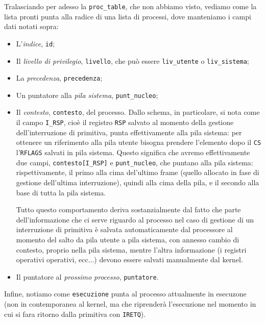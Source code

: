 \documentclass[a4paper,11pt]{article}
\begin{document}
Tralasciando per adesso la \lstinline|proc_table|, che non abbiamo visto, vediamo come la lista pronti punta alla radice di una lista di processi, dove manteniamo i campi dati notati sopra:
\begin{itemize}
	\item L'\textit{indice}, \lstinline|id|; 
	\item Il \textit{livello di privilegio}, \lstinline|livello|, che può essere \lstinline|liv_utente| o \lstinline|liv_sistema|; 
	\item La \textit{precedenza}, \lstinline|precedenza|; 
	\item Un puntatore alla \textit{pila sistema}, \lstinline|punt_nucleo|;
	\item Il \textit{contesto}, \lstinline|contesto|, del processo. Dallo schema, in particolare, si nota come il campo \lstinline|I_RSP|, cioè il registro \lstinline|RSP| salvato al momento della gestione dell'interruzione di primitiva, punta effettivamente alla pila sistema: per ottenere un riferimento alla pila utente bisogna prendere l'elemento dopo il \lstinline|CS| l'\lstinline|RFLAGS| salvati in pila sistema.
		Questo significa che avremo effettivamente due campi, \lstinline|contesto[I_RSP]| e \lstinline|punt_nucleo|, che puntano alla pila sistema: rispettivamente, il primo alla cima del'ultimo frame (quello allocato in fase di gestione dell'ultima interruzione), quindi alla cima della pila, e il secondo alla base di tutta la pila sistema. 

		Tutto questo comportamento deriva sostanzialmente dal fatto che parte dell'informazione che ci serve riguardo al processo nel caso di gestione di un interruzione di primitiva è salvata automaticamente dal processore al momento del salto da pila utente a pila sistema, con annesso cambio di contesto, proprio nella pila sistema, mentre l'altra informazione (i registri operativi operativi, ecc...) devono essere salvati manualmente dal kernel.
	\item Il puntatore al \textit{prossimo processo}, \lstinline|puntatore|.
\end{itemize}

Infine, notiamo come \lstinline|esecuzione| punta al processo attualmente in esecuzone (non in contemporanea al kernel, ma che riprenderà l'esecuzione nel momento in cui si fara ritorno dalla primitiva con \lstinline|IRETQ|).
\end{document}
